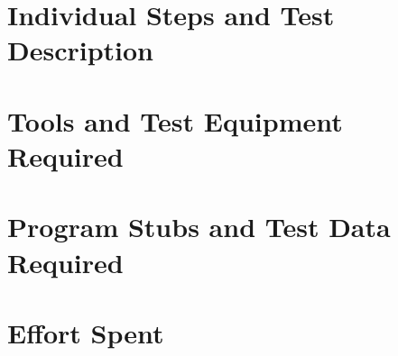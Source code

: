 \documentclass{article}
\begin{document}
\section{Individual Steps and Test Description}

\newpage

\section{Tools and Test Equipment Required}

\newpage
\section{Program Stubs and Test Data Required}

\newpage
\section{Effort Spent}
\end{document}
